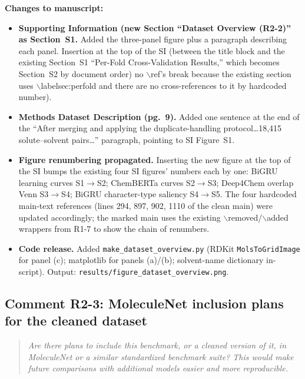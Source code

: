 \documentclass[11pt]{article}
\newenvironment{reviewer}{%
  \begin{quote}\itshape\color{black!70}}{%
  \end{quote}}
\newenvironment{changes}{%
  \noindent\textbf{Changes to manuscript:}
  \begin{itemize}[leftmargin=2em,itemsep=2pt]}{%
  \end{itemize}\medskip}
\begin{document}
\begin{changes}
 \item \textbf{Supporting Information (new Section ``Dataset Overview (R2-2)'' as Section~S1.} Added the three-panel figure plus a paragraph describing each panel. Insertion at the top of the SI (between the title block and the existing Section~S1 ``Per-Fold Cross-Validation Results,'' which becomes Section~S2 by document order) no $\backslash$ref's break because the existing section uses $\backslash$label{sec:perfold} and there are no cross-references to it by hardcoded number).
  \item \textbf{Methods Dataset Description (pg.\ 9).} Added one sentence at the end of the ``After merging and applying the duplicate-handling protocol\ldots 18{,}415 solute--solvent pairs\ldots'' paragraph, pointing to SI Figure~S1.
  \item \textbf{Figure renumbering propagated.} Inserting the new figure at the top of the SI bumps the existing four SI figures' numbers each by one: BiGRU learning curves S1$\to$S2; ChemBERTa curves S2$\to$S3; Deep4Chem overlap Venn S3$\to$S4; BiGRU character-type saliency S4$\to$S5. The four hardcoded main-text references (lines 294, 897, 902, 1110 of the clean main) were updated accordingly; the marked main uses the existing $\backslash$removed/$\backslash$added wrappers from R1-7 to show the chain of renumbers.
  \item \textbf{Code release.} Added \texttt{make\_dataset\_overview.py} (RDKit \texttt{MolsToGridImage} for panel (c); matplotlib for panels (a)/(b); solvent-name dictionary in-script). Output: \texttt{results/figure\_dataset\_overview.png}.
\end{changes}

\subsection*{Comment R2-3: MoleculeNet inclusion plans for the cleaned dataset}
\begin{reviewer}
Are there plans to include this benchmark, or a cleaned version of it, in MoleculeNet or a similar standardized benchmark suite? This would make future comparisons with additional models easier and more reproducible.
\end{reviewer}
\end{document}
